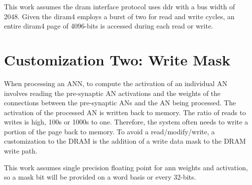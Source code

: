 This work assumes the \ac{dram} interface protocol uses \ac{ddr} with a bus width of 2048. Given the \ac{diram4} employs a burst of two for read and write cycles, an entire \ac{diram4} page of 4096-bits is accessed during each read or write. 

\section{Customization Two: Write Mask}
\label{sec:Write Mask}
When processing an ANN, to compute the activation of an individual AN involves reading the pre-synaptic AN activations and the weights of the connections between the pre-synaptic ANs and the AN being processed. The activation of the processed AN is written back to memory. The ratio of reads to writes is high, 100s or 1000s to one. Therefore, the system often needs to write a portion of the page back to memory. To avoid a read/modify/write, a customization to the DRAM is the addition of a write data mask to the DRAM write path.

This work assumes single precision floating point for \ac{ann} weights and activation, so a mask bit will be provided on a word basis or every 32-bits.

